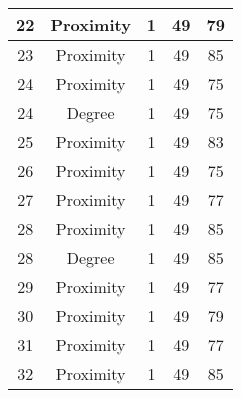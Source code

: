 \documentclass[results.tex]{subfiles}
\begin{document}
\begin{center}
\begin{tabular}{| c || c | c | c | c |}
            \hline
            22                      & Proximity                    & 1                      & 49                      & 79                   \\
            \hline
            23                      & Proximity                    & 1                      & 49                      & 85                   \\
            \hline
            24                      & Proximity                    & 1                      & 49                      & 75                   \\
            \hline
            24                      & Degree                       & 1                      & 49                      & 75                   \\
            \hline
            25                      & Proximity                    & 1                      & 49                      & 83                   \\
            \hline
            26                      & Proximity                    & 1                      & 49                      & 75                   \\
            \hline
            27                      & Proximity                    & 1                      & 49                      & 77                   \\
            \hline
            28                      & Proximity                    & 1                      & 49                      & 85                   \\
            \hline
            28                      & Degree                       & 1                      & 49                      & 85                   \\
            \hline
            29                      & Proximity                    & 1                      & 49                      & 77                   \\
            \hline
            30                      & Proximity                    & 1                      & 49                      & 79                   \\
            \hline
            31                      & Proximity                    & 1                      & 49                      & 77                   \\
            \hline
            32                      & Proximity                    & 1                      & 49                      & 85                   \\

\end{tabular}
\end{center}
\end{document}
